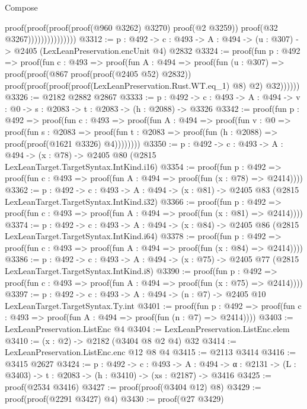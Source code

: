 \begin{lexlean}{Compose}
\begin{coremodule}
                              proof(proof(proof(proof(@960 @3262) @3270) proof(@2 @3259))
                                  proof(@32 @3267)))))))))))))))
@3312 := {p : @492} ->
  {c : @493} -> {A : @494} -> (u : @307) -> @2405 (LexLeanPreservation.encUnit @4) @2832
@3324 := proof(fun {p : @492} =>
    proof(fun {c : @493} =>
      proof(fun {A : @494} =>
        proof(fun (u : @307) =>
          proof(proof(@867 proof(proof(@2405 @52) @2832))
              proof(proof(proof(proof(LexLeanPreservation.Rust.WT.eq_1) @8) @2) @32))))))
@3326 := @2182 @2882 @2867
@3333 := {p : @492} ->
  {c : @493} -> {A : @494} -> {v : @0} -> {s : @2083} -> {t : @2083} -> (h : @2088) -> @3326
@3342 := proof(fun {p : @492} =>
    proof(fun {c : @493} =>
      proof(fun {A : @494} =>
        proof(fun {v : @0} =>
          proof(fun {s : @2083} =>
            proof(fun {t : @2083} => proof(fun (h : @2088) => proof(proof(@1621 @3326) @4))))))))
@3350 := {p : @492} ->
  {c : @493} -> {A : @494} -> (x : @78) -> @2405 @80 (@2815 LexLeanTarget.TargetSyntax.IntKind.i16)
@3354 := proof(fun {p : @492} =>
    proof(fun {c : @493} => proof(fun {A : @494} => proof(fun (x : @78) => @2414))))
@3362 := {p : @492} ->
  {c : @493} -> {A : @494} -> (x : @81) -> @2405 @83 (@2815 LexLeanTarget.TargetSyntax.IntKind.i32)
@3366 := proof(fun {p : @492} =>
    proof(fun {c : @493} => proof(fun {A : @494} => proof(fun (x : @81) => @2414))))
@3374 := {p : @492} ->
  {c : @493} -> {A : @494} -> (x : @84) -> @2405 @86 (@2815 LexLeanTarget.TargetSyntax.IntKind.i64)
@3378 := proof(fun {p : @492} =>
    proof(fun {c : @493} => proof(fun {A : @494} => proof(fun (x : @84) => @2414))))
@3386 := {p : @492} ->
  {c : @493} -> {A : @494} -> (x : @75) -> @2405 @77 (@2815 LexLeanTarget.TargetSyntax.IntKind.i8)
@3390 := proof(fun {p : @492} =>
    proof(fun {c : @493} => proof(fun {A : @494} => proof(fun (x : @75) => @2414))))
@3397 := {p : @492} ->
  {c : @493} -> {A : @494} -> (n : @7) -> @2405 @10 LexLeanTarget.TargetSyntax.Ty.int
@3401 := proof(fun {p : @492} =>
    proof(fun {c : @493} => proof(fun {A : @494} => proof(fun (n : @7) => @2414))))
@3403 := LexLeanPreservation.ListEnc @4
@3404 := LexLeanPreservation.ListEnc.elem
@3410 := (x : @2) -> @2182 (@3404 @8 @2 @4) @32
@3414 := LexLeanPreservation.ListEnc.enc @12 @8 @4
@3415 := @2113 @3414
@3416 := @3415 @2627
@3424 := {p : @492} ->
  {c : @493} ->
  {A : @494} -> {α : @2131} -> (L : @3403) -> {t : @2083} -> (h : @3410) -> (xs : @2187) -> @3416
@3425 := proof(@2534 @3416)
@3427 := proof(proof(@3404 @12) @8)
@3429 := proof(proof(@2291 @3427) @4)
@3430 := proof(@27 @3429)

\end{coremodule}
\end{lexlean}
